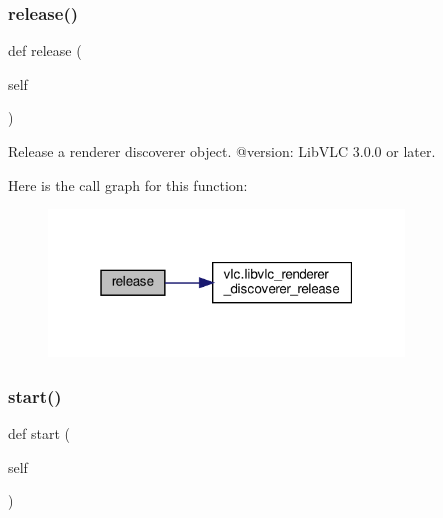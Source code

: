 \subsubsection{\texorpdfstring{release()}{release()}}
{\footnotesize\ttfamily def release (\begin{DoxyParamCaption}\item[{}]{self }\end{DoxyParamCaption})}

\begin{DoxyVerb}Release a renderer discoverer object.
@version: LibVLC 3.0.0 or later.
\end{DoxyVerb}
 Here is the call graph for this function\+:
\nopagebreak
\begin{figure}[H]
\begin{center}
\leavevmode
\includegraphics[width=268pt]{classvlc_1_1_renderer_discoverer_a4cd51e19135e5ad4a19eae3ea9c60537_cgraph}
\end{center}
\end{figure}
\mbox{\label{classvlc_1_1_renderer_discoverer_af1af6ddf04f00f958949618f79c33b82}} 
\subsubsection{\texorpdfstring{start()}{start()}}
{\footnotesize\ttfamily def start (\begin{DoxyParamCaption}\item[{}]{self }\end{DoxyParamCaption})}

